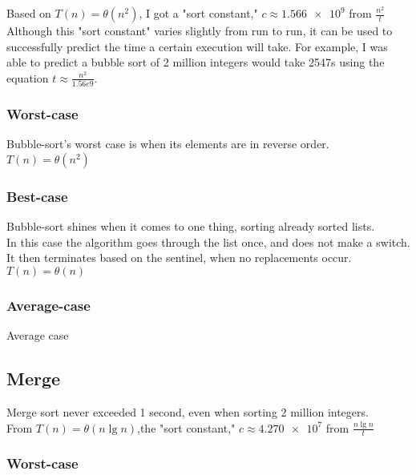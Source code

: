 \documentclass{article}
\begin{document}
	Based on $T(n) = \theta (n^2)$, I got a "sort constant," $c \approx \num{1.566e9}$ from $\frac{n^2}{t}$ \\

Although this "sort constant" varies slightly from run to run, it can be used to successfully predict the time a certain
execution will take. For example, I was able to predict a bubble sort of 2 million integers would take 2547s using
the equation $t \approx \frac{n^2}{1.56e9}$.

\subsubsection{Worst-case}

Bubble-sort's worst case is when its elements are in reverse order. \\

	$T(n) = \theta (n^2)$

\subsubsection{Best-case}

Bubble-sort shines when it comes to one thing, sorting already sorted lists. \\
In this case the algorithm goes through the list once, and does not make a switch. It then 
terminates based on the sentinel, when no replacements occur. \\

	$T(n) = \theta (n)$

\subsubsection{Average-case}

Average case 

\newpage


\subsection{Merge}

Merge sort never exceeded 1 second, even when sorting 2 million integers.\\

From $T(n) = \theta (n \lg{n})$,the "sort constant," $c \approx \num{4.270e7}$ from $\frac{n \lg{n}}{t}$

\subsubsection{Worst-case}
\end{document}
